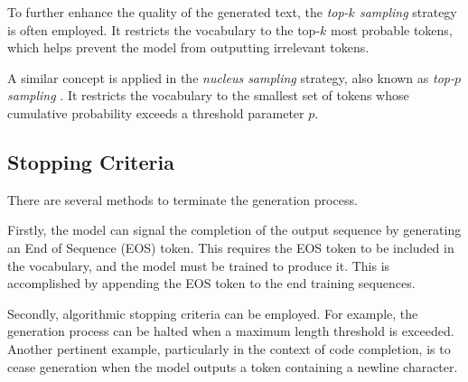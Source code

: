 To further enhance the quality of the generated text, the \textit{top-\(k\) sampling} strategy is often employed. It restricts the vocabulary to the top-\(k\) most probable tokens, which helps prevent the model from outputting irrelevant tokens.

A similar concept is applied in the \textit{nucleus sampling} strategy, also known as \textit{top-\(p\) sampling} \parencite{holtzman2019}. It restricts the vocabulary to the smallest set of tokens whose cumulative probability exceeds a threshold parameter \(p\).

\subsection{Stopping Criteria}

There are several methods to terminate the generation process.

Firstly, the model can signal the completion of the output sequence by generating an End of Sequence (EOS) token. This requires the EOS token to be included in the vocabulary, and the model must be trained to produce it. This is accomplished by appending the EOS token to the end training sequences.

Secondly, algorithmic stopping criteria can be employed. For example, the generation process can be halted when a maximum length threshold is exceeded. Another pertinent example, particularly in the context of code completion, is to cease generation when the model outputs a token containing a newline character.

